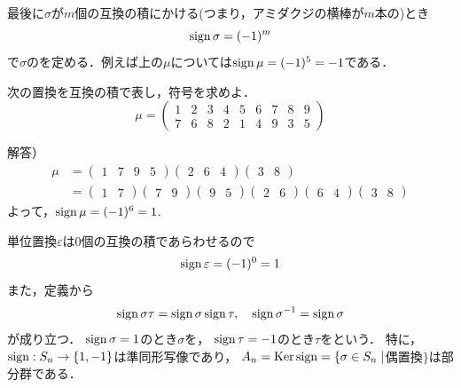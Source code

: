 \emptyline
最後に$\sigma$が$m$個の互換の積にかける(つまり，アミダクジの横棒が$m$本の)とき
\[
     \operatorname{sign} \sigma=(-1)^m
\]
で$\sigma$のを定める．例えば上の$\mu$については$\operatorname{sign}\mu=(-1)^5=-1$である．
\begin{exQ}  次の置換を互換の積で表し，符号を求めよ．
\[
     \mu=\begin{pmatrix}
          1&2&3&4&5&6&7&8&9\\
          7&6&8&2&1&4&9&3&5
     \end{pmatrix}
\]
\end{exQ}
解答）
\[
\begin{split}
     \mu&=
     \begin{pmatrix}
          1&7&9&5
     \end{pmatrix}
     \begin{pmatrix}
          2&6&4
     \end{pmatrix}
     \begin{pmatrix}
          3&8
     \end{pmatrix}\\
     &=\begin{pmatrix}
          1&7
     \end{pmatrix}
     \begin{pmatrix}
          7&9
     \end{pmatrix}
     \begin{pmatrix}
          9&5
     \end{pmatrix}
     \begin{pmatrix}
          2&6
     \end{pmatrix}
     \begin{pmatrix}
          6&4
     \end{pmatrix}
     \begin{pmatrix}
          3&8
     \end{pmatrix}
\end{split}
\]
よって，$\operatorname{sign} \mu=(-1)^6=1$.
\emptyline

単位置換$\varepsilon$は$0$個の互換の積であらわせるので
\[
     \operatorname{sign}\varepsilon=(-1)^0=1
\]
また，定義から
\[
     \operatorname{sign} \sigma\tau=\operatorname{sign} \sigma\operatorname{sign} \tau,\quad \operatorname{sign} \sigma^{-1}= \operatorname{sign} \sigma
\]
が成り立つ．
$\operatorname{sign} \sigma=1$のとき$\sigma$を，
$\operatorname{sign} \tau=-1$のとき$\tau$をという．
特に，$\operatorname{sign}:S_n\to \{1, -1\}$は準同形写像であり，
$A_n = \operatorname{Ker} \operatorname{sign} =\{\sigma\in S_n\mid $偶置換$\}$は部分群である．

